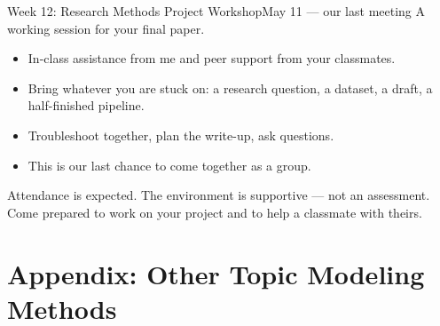 \documentclass[aspectratio=169,10pt]{beamer}
\begin{document}
\begin{frame}{Week 12: Research Methods Project Workshop}{May 11 --- our last meeting}
  A working session for your final paper.
  \begin{itemize}
    \item In-class assistance from me and peer support from your classmates.
    \item Bring whatever you are stuck on: a research question, a dataset, a draft, a half-finished pipeline.
    \item Troubleshoot together, plan the write-up, ask questions.
    \item This is our last chance to come together as a group.
  \end{itemize}

  \vspace{0.4em}
  \begin{callcoral}
    Attendance is expected. The environment is supportive --- not an assessment. Come prepared to work on
    your project and to help a classmate with theirs.
  \end{callcoral}
\end{frame}

\appendix
\section{Appendix: Other Topic Modeling Methods}
\end{document}
